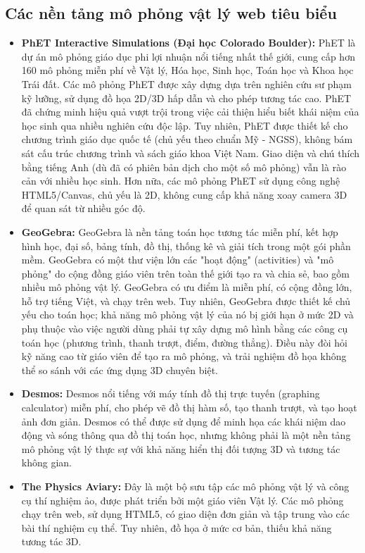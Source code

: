 \subsection{Các nền tảng mô phỏng vật lý web tiêu biểu}

\begin{itemize}
    \item \textbf{PhET Interactive Simulations (Đại học Colorado Boulder):} PhET là dự án mô phỏng giáo dục phi lợi nhuận nổi tiếng nhất thế giới, cung cấp hơn 160 mô phỏng miễn phí về Vật lý, Hóa học, Sinh học, Toán học và Khoa học Trái đất. Các mô phỏng PhET được xây dựng dựa trên nghiên cứu sư phạm kỹ lưỡng, sử dụng đồ họa 2D/3D hấp dẫn và cho phép tương tác cao. PhET đã chứng minh hiệu quả vượt trội trong việc cải thiện hiểu biết khái niệm của học sinh qua nhiều nghiên cứu độc lập. Tuy nhiên, PhET được thiết kế cho chương trình giáo dục quốc tế (chủ yếu theo chuẩn Mỹ - NGSS), không bám sát cấu trúc chương trình và sách giáo khoa Việt Nam. Giao diện và chú thích bằng tiếng Anh (dù đã có phiên bản dịch cho một số mô phỏng) vẫn là rào cản với nhiều học sinh. Hơn nữa, các mô phỏng PhET sử dụng công nghệ HTML5/Canvas, chủ yếu là 2D, không cung cấp khả năng xoay camera 3D để quan sát từ nhiều góc độ.
    
    \item \textbf{GeoGebra:} GeoGebra là nền tảng toán học tương tác miễn phí, kết hợp hình học, đại số, bảng tính, đồ thị, thống kê và giải tích trong một gói phần mềm. GeoGebra có một thư viện lớn các "hoạt động" (activities) và "mô phỏng" do cộng đồng giáo viên trên toàn thế giới tạo ra và chia sẻ, bao gồm nhiều mô phỏng vật lý. GeoGebra có ưu điểm là miễn phí, có cộng đồng lớn, hỗ trợ tiếng Việt, và chạy trên web. Tuy nhiên, GeoGebra được thiết kế chủ yếu cho toán học; khả năng mô phỏng vật lý của nó bị giới hạn ở mức 2D và phụ thuộc vào việc người dùng phải tự xây dựng mô hình bằng các công cụ toán học (phương trình, thanh trượt, điểm, đường thẳng). Điều này đòi hỏi kỹ năng cao từ giáo viên để tạo ra mô phỏng, và trải nghiệm đồ họa không thể so sánh với các ứng dụng 3D chuyên biệt.
    
    \item \textbf{Desmos:} Desmos nổi tiếng với máy tính đồ thị trực tuyến (graphing calculator) miễn phí, cho phép vẽ đồ thị hàm số, tạo thanh trượt, và tạo hoạt ảnh đơn giản. Desmos có thể được sử dụng để minh họa các khái niệm dao động và sóng thông qua đồ thị toán học, nhưng không phải là một nền tảng mô phỏng vật lý thực sự với khả năng hiển thị đối tượng 3D và tương tác không gian.
    
    \item \textbf{The Physics Aviary:} Đây là một bộ sưu tập các mô phỏng vật lý và công cụ thí nghiệm ảo, được phát triển bởi một giáo viên Vật lý. Các mô phỏng chạy trên web, sử dụng HTML5, có giao diện đơn giản và tập trung vào các bài thí nghiệm cụ thể. Tuy nhiên, đồ họa ở mức cơ bản, thiếu khả năng tương tác 3D.
\end{itemize}

